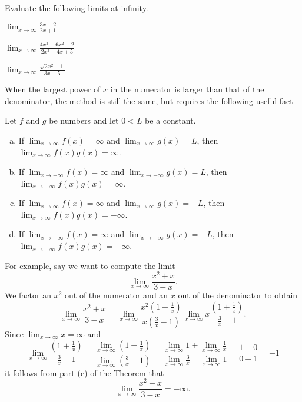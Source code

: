 \documentclass[10pt]{amsart}
\begin{document}
\newpage
Evaluate the following limits at infinity.
\begin{multicols}{3}
  \begin{thm}
    \(\displaystyle{\lim_{x \to \infty} \frac{3x - 2}{2x + 1}}\)
  \end{thm}

  \begin{thm}
    \(\displaystyle{\lim_{x \to \infty} \frac{4x^3 + 6x^2 - 2}{2x^3 - 4x + 5}}\)
  \end{thm}

  \begin{thm}
    \(\displaystyle{\lim_{x \to \infty} \frac{\sqrt{2x^2 + 1}}{3x - 5}}\)
  \end{thm}
\end{multicols}
\newpage

When the largest power of \(x\) in the numerator is larger than that of the denominator, the method is still the same, but requires the following useful fact

\begin{thm*}
  Let \(f\) and \(g\) be numbers and let  \(0 < L\) be a constant.
  \begin{enumerate}[(a)]
  \item
    If \(\lim_{x \to \infty} f(x) = \infty\) and \(\lim_{x \to \infty} g(x) = L\), then \(\lim_{x \to \infty} f(x)g(x) = \infty\).
  \item
    If \(\lim_{x \to -\infty} f(x) = \infty\) and \(\lim_{x \to -\infty} g(x) = L\), then \(\lim_{x \to -\infty} f(x)g(x) = \infty\).
  \item
    If \(\lim_{x \to \infty} f(x) = \infty\) and \(\lim_{x \to \infty} g(x) = -L\), then \(\lim_{x \to \infty} f(x)g(x) = -\infty\).
  \item
    If \(\lim_{x \to -\infty} f(x) = \infty\) and \(\lim_{x \to -\infty} g(x) = -L\), then \(\lim_{x \to -\infty} f(x)g(x) = -\infty\).
  \end{enumerate}
\end{thm*}

For example, say we want to compute the limit
\[\lim_{x \to \infty} \frac{x^2 + x}{3 - x}.\]
We factor an \(x^2\) out of the numerator and an \(x\) out of the denominator to obtain
\[\lim_{x \to \infty} \frac{x^2 + x}{3 - x} = \lim_{x \to \infty} \frac{x^2(1 + \frac{1}{x})}{x(\frac{3}{x} - 1)} \lim_{x \to \infty} x\frac{(1 + \frac{1}{x})}{\frac{3}{x} - 1}.\]
Since \(\lim_{x \to \infty} x = \infty\) and 
\[\lim_{x \to \infty} \frac{\left(1 + \frac{1}{x}\right)}{\frac{3}{x} - 1} = \frac{\lim_{x \to \infty}\left(1 + \frac{1}{x}\right)}{\lim_{x \to \infty} \left(\frac{3}{x} - 1\right)} = \frac{\lim_{x \to \infty}1 + \lim_{x \to \infty}\frac{1}{x}}{\lim_{x \to \infty} \frac{3}{x} - \lim_{x \to \infty}1} = \frac{1 + 0}{0 - 1} = -1\]
it follows from part (c) of the Theorem that
\[\lim_{x \to \infty} \frac{x^2 + x}{3 - x} = -\infty.\]
\end{document}

